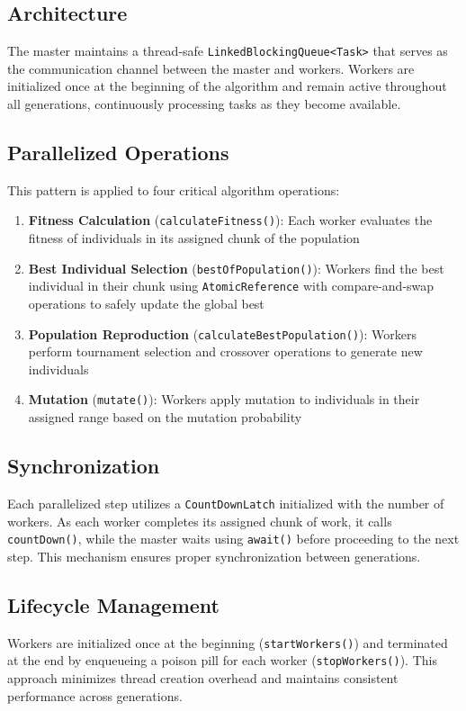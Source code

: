 \subsection{Architecture}
The master maintains a thread-safe \texttt{LinkedBlockingQueue<Task>} that
serves as the communication channel between the master and workers. Workers are
initialized once at the beginning of the algorithm and remain active throughout
all generations, continuously processing tasks as they become available.

\subsection{Parallelized Operations}
This pattern is applied to four critical algorithm operations:

\begin{enumerate}
    \item \textbf{Fitness Calculation} (\texttt{calculateFitness()}): Each
    worker evaluates the fitness of individuals in its assigned chunk of the
    population
    \item \textbf{Best Individual Selection} (\texttt{bestOfPopulation()}):
    Workers find the best individual in their chunk using
    \texttt{AtomicReference} with compare-and-swap operations to safely update
    the global best
    \item \textbf{Population Reproduction} (\texttt{calculateBestPopulation()}):
    Workers perform tournament selection and crossover operations to generate
    new individuals
    \item \textbf{Mutation} (\texttt{mutate()}): Workers apply mutation to
    individuals in their assigned range based on the mutation probability
\end{enumerate}

\subsection{Synchronization}
Each parallelized step utilizes a \texttt{CountDownLatch} initialized with the
number of workers. As each worker completes its assigned chunk of work, it calls
\texttt{countDown()}, while the master waits using \texttt{await()} before
proceeding to the next step. This mechanism ensures proper synchronization
between generations.

\subsection{Lifecycle Management}
Workers are initialized once at the beginning (\texttt{startWorkers()}) and
terminated at the end by enqueueing a poison pill for each worker
(\texttt{stopWorkers()}). This approach minimizes thread creation overhead and
maintains consistent performance across generations.

